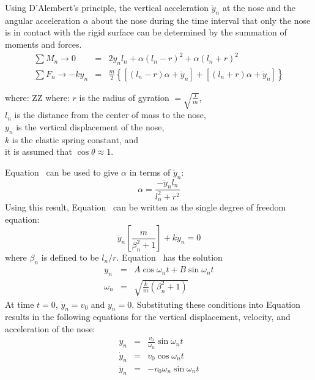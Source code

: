 Using D'Alembert's principle, the vertical acceleration $\ddot y_n$ at the
nose and the angular acceleration $\alpha$ about the nose during
the time interval that only the nose is in contact with the rigid
surface can be determined by the summation of moments and forces. 
\begin{eqnarray}
\sum M_n\rightarrow 0  & = & 2 \ddot y_n l_n +\alpha(l_n-r)^2
     +\alpha(l_n+r)^2\label{e1} \\ 
\sum F_n\rightarrow -ky_n & = & \frac{m}{2}\left\{\left[(l_n-r)\alpha 
     +\ddot y_n \right] +\left[(l_n+r)\alpha+\ddot y_n\right]\right\}\label{e2}
\end{eqnarray}
\begin{tabbing}
where: \=ZZ\= \kill
where: \>$r  $\> is the radius of gyration ${}=\sqrt{\frac{I}{m}}$,\\
       \>$l_n$\> is the distance from the center of mass to the nose,\\ 
       \>$y_n$\> is the vertical displacement of the nose,\\
       \>$k  $\> is the elastic spring constant, and\\
       \>     \> it is assumed that $\cos\theta\approx 1$.
\end{tabbing}
Equation~ can be used to give $\alpha$ in terms of $\ddot y_n$:
\begin{equation}
\alpha = \frac{-\ddot y_n l_n}{l_n^2 + r^2}\label{eq:alpha}
\end{equation}
Using this result, Equation~ can be written as the single degree of 
freedom equation:
\begin{equation}
\ddot y_n\left[\frac{m}{\beta_n^2+1}\right] + ky_n = 0\label{eq:diff}
\end{equation}
where $\beta_n$ is defined to be $l_n/r$.  Equation~ has the
solution
\begin{eqnarray}
     y_n & = & A\cos\omega_n t + B\sin\omega_n t\label{eq:acbs}\\
\omega_n & = & \sqrt{\frac{k}{m}\left(\beta_n^2+1\right)}
\end{eqnarray}
At time $t=0$, $\dot y_n = v_0$ and $y_n = 0$.  Substituting these 
conditions into Equation~ results in the following equations
for the vertical displacement, velocity, and acceleration of the nose: 
\begin{eqnarray}
      y_n & = &  \frac{v_0}{\omega_n}\sin\omega_n t\\
 \dot y_n & = &  v_0\cos\omega_n t\label{eq:vl}\\
\ddot y_n & = & -v_0\omega_n\sin\omega_n t\label{eq:ayl}
\end{eqnarray}
